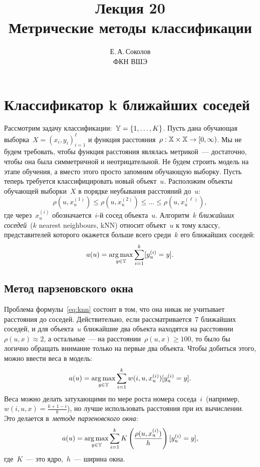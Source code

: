 \documentclass[12pt,fleqn]{article}
\begin{document}
\title{Лекция 20\\Метрические методы классификации}
\author{Е.\,А.\,Соколов\\ФКН ВШЭ}
\maketitle

\section{Классификатор k ближайших соседей}

Рассмотрим задачу классификации:~$\mathbb{Y} = \{1, \dots, K\}$.
Пусть дана обучающая выборка~$X = (x_i, y_i)_{i = 1}^{\ell}$
и функция расстояния~$\rho: \XX \times \XX \to [0, \infty)$.
Мы не будем требовать, чтобы функция расстояния являлась метрикой~---
достаточно, чтобы она была симметричной и неотрицательной.
Не будем строить модель на этапе обучения, а вместо этого просто запомним
обучающую выборку.
Пусть теперь требуется классифицировать новый объект~$u$.
Расположим объекты обучающей выборки~$X$ в порядке неубывания
расстояний до~$u$:
\[
    \rho(u, x_u^{(1)})
    \leq
    \rho(u, x_u^{(2)})
    \leq
    \dots
    \leq
    \rho(u, x_u^{(\ell)}),
\]
где через~$x_u^{(i)}$ обозначается~$i$-й сосед объекта~$u$.
Алгоритм~\emph{$k$ ближайших соседей}~($k$ nearest neighbours, kNN) относит объект~$u$ к тому классу,
представителей которого окажется больше всего среди~$k$ его ближайших соседей:
\begin{equation}
\label{eq:knn}
    a(u) = \mathop{\rm arg\,max}\limits_{y \in \mathbb{Y}} \sum_{i = 1}^{k} [y_u^{(i)} = y].
\end{equation}

\subsection{Метод парзеновского окна}
Проблема формулы~\eqref{eq:knn} состоит в том, что она никак не учитывает расстояния до соседей.
Действительно, если рассматривается~$7$ ближайших соседей, и для объекта~$u$
ближайшие два объекта находятся на расстоянии~$\rho(u, x) \approx 2$,
а остальные~--- на расстоянии~$\rho(u, x) \geq 100$,
то было бы логично обращать внимание только на первые два объекта.
Чтобы добиться этого, можно ввести веса в модель:
\begin{equation}
\label{eq:knnWeighted}
a(u) = \mathop{\rm arg\,max}\limits_{y \in \mathbb{Y}} \sum_{i = 1}^{k} w(i, u, x_u^{(i)}) [y_u^{(i)} = y].
\end{equation}
Веса можно делать затухающими по мере роста номера соседа~$i$~(например, $w(i, u, x) = \frac{k + 1 - i}{k}$),
но лучше использовать расстояния при их вычислении.
Это делается в~\emph{методе парзеновского окна}:
\begin{equation}
\label{eq:knnParzen}
    a(u)
    =
    \mathop{\rm arg\,max}\limits_{y \in \mathbb{Y}}
        \sum_{i = 1}^{k}
        K \left(
            \frac{\rho(u, x_u^{(i)})}{h}
        \right)
        [y_u^{(i)} = y],
\end{equation}
где~$K$~--- это ядро,~$h$~--- ширина окна.
\end{document}
